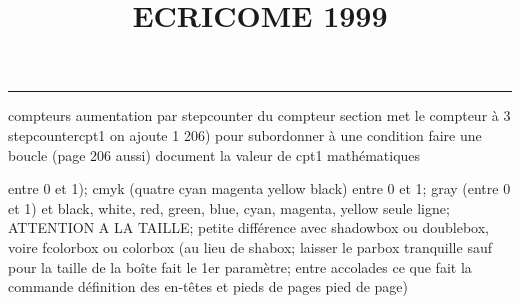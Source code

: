 \documentclass[11pt]{article}%
\title{\bf \vspace{-2cm} ECRICOME 1999} %
\author{} %
\date{} %
\renewcommand{\headrulewidth}{0pt}%
\renewcommand{\footrulewidth}{0.4pt}%
\begin{document}
\maketitle %
\vspace{-1.4cm}\hrule %
\thispagestyle{fancy}

\vspace*{.2cm}



compteurs%
aumentation par stepcounter du compteur section%
met le compteur à 3%
stepcounter{cpt1} on ajoute 1%
206) pour subordonner à une condition %
faire une boucle (page 206 aussi) %
document la valeur de cpt1 
mathématiques\newcommand{\ch}{\operatorname{ch}} 
\newcommand{\sh}{\operatorname{sh}}
\renewcommand{\tanh}{\operatorname{th}}
\renewcommand{\sinh}{\operatorname{sh}}
\renewcommand{\cosh}{\operatorname{ch}}
\newcommand{\argsh}{\operatorname{argsh}}
\newcommand{\argch}{\operatorname{argch}}
\newcommand{\argth}{\operatorname{argth}}
\newcommand{\Id}{\operatorname{Id}}
\renewcommand{\leq}{\leq}
\renewcommand{\geq}{\geq }

\newcommand{\dlim}{\lim}
\newcommand{\dsum}{\sum}
\newcommand{\dint}{\int}
\newcommand{\dprod}{\prod}



entre 0 et 1); cmyk (quatre cyan magenta yellow black) entre 0 et 1;
gray (entre 0 et 1) et black, white, red, green, blue, cyan, magenta,
yellow%
seule ligne; ATTENTION A LA TAILLE; petite différence avec shadowbox ou
doublebox, voire fcolorbox ou colorbox (au lieu de shabox; laisser le
parbox tranquille sauf pour la taille de la boîte
\newcommand{\Tbox}[1]{\begin{center} \shabox{\parbox{0.6
\linewidth}{#1}} \end{center}} %
fait le 1er paramètre; entre accolades ce que fait la commande
définition des en-têtes et pieds de pages\pagestyle{fancy}
\chead{}
\rfoot[ \ \thepage]{\thepage}
\cfoot{}
\lfoot{}
\thispagestyle{fancy} %
pied de page)\renewcommand{\footrulewidth}{0.4pt}
\renewcommand{\headrulewidth}{0.4pt}
\end{document}
